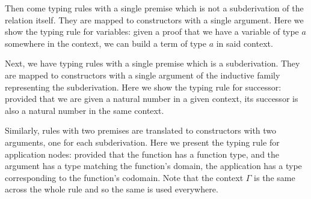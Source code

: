 Then come typing rules with a single premise which is not a subderivation
of the relation itself.
They are mapped to constructors with a single argument.
%
Here we show the typing rule for variables: given a proof that we have a
variable of type $a$ somewhere in the context, we can build a term of type
$a$ in said context.

\begin{center}
\begin{minipage}{0.45\textwidth}
\inferenceVar
\end{minipage}\hfill
\begin{minipage}{0.45\textwidth}
\end{minipage}
\end{center}

Next, we have typing rules with a single premise which is a subderivation.
They are mapped to constructors with a single argument of the inductive family
representing the subderivation.
%
Here we show the typing rule for successor: provided that we are given
a natural number in a given context, its successor is also a natural
number in the same context.

\begin{center}
\begin{minipage}{0.45\textwidth}
\inferenceInc
\end{minipage}\hfill
\begin{minipage}{0.45\textwidth}
\end{minipage}
\end{center}

Similarly, rules with two premises are translated to constructors
with two arguments, one for each subderivation.
%
Here we present the typing rule for application nodes: provided that
the function has a function type, and the argument has a type matching
the function's domain, the application has a type corresponding to the
function's codomain.
Note that the context $\Gamma$ is the same across the whole rule and
so the same  is used everywhere.


\begin{center}
\begin{minipage}{0.35\textwidth}
\inferenceApp
\end{minipage}\hfill
\begin{minipage}{0.55\textwidth}
\end{minipage}
\end{center}

